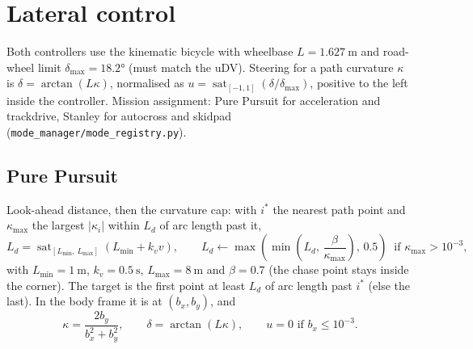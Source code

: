 \documentclass[11pt,a4paper]{article}
\newcommand{\sat}{\operatorname{sat}}
\begin{document}
\section{Lateral control}
Both controllers use the kinematic bicycle with wheelbase $L = \SI{1.627}{\metre}$ and
road-wheel limit $\delta_{\max} = \ang{18.2}$ (must match the uDV). Steering for a path
curvature $\kappa$ is $\delta = \arctan(L\kappa)$, normalised as
$u = \sat_{[-1,1]}(\delta / \delta_{\max})$, positive to the left inside the controller.
Mission assignment: Pure Pursuit for acceleration and trackdrive, Stanley for autocross
and skidpad (\texttt{mode\_manager/mode\_registry.py}).

\subsection{Pure Pursuit}
Look-ahead distance, then the curvature cap: with $i^*$ the nearest path point and
$\kappa_{\max}$ the largest $|\kappa_i|$ within $L_d$ of arc length past it,
\begin{equation}
L_d = \sat_{[L_{\min},\,L_{\max}]}\!\left(L_{\min} + k_v v\right), \qquad
L_d \leftarrow \max\!\left(\min\!\left(L_d,\, \frac{\beta}{\kappa_{\max}}\right),\, 0.5\right)
\ \text{ if } \kappa_{\max} > 10^{-3},
\end{equation}
with $L_{\min} = \SI{1}{\metre}$, $k_v = \SI{0.5}{\second}$, $L_{\max} = \SI{8}{\metre}$ and
$\beta = 0.7$ (the chase point stays inside the corner). The target is the first point
at least $L_d$ of arc length past $i^*$ (else the last). In the body frame it is at
$(b_x, b_y)$, and
\begin{equation}
\kappa = \frac{2 b_y}{b_x^2 + b_y^2}, \qquad \delta = \arctan(L\kappa), \qquad
u = 0 \text{ if } b_x \le 10^{-3}.
\end{equation}
\end{document}
